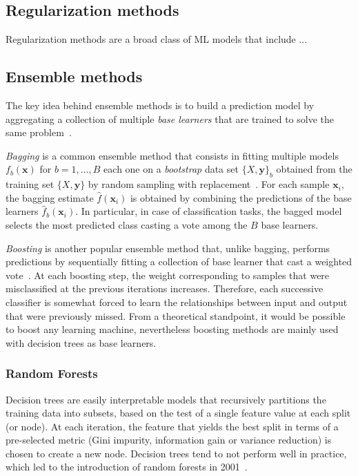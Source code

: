        

    \subsection{Regularization methods}
    Regularization methods are a broad class of ML models that include ...

    \subsection{Ensemble methods}

    The key idea behind ensemble methods is to build a prediction model by aggregating a collection of multiple \textit{base learners} that are trained to solve the same problem~\citep{zhou2012ensemble}.

    \textit{Bagging} is a common ensemble method that consists in fitting multiple models $f_b(\bm{x})$ for $b=1,\dots,B$ each one on a \textit{bootstrap} data set $\{X,\bm{y}\}_b$ obtained from the training set $\{X,\bm{y}\}$ by random sampling with replacement~\citep{hastie2009elements}. For each sample $\bm{x}_i$, the bagging estimate $\hat{f}(\bm{x}_i)$ is obtained by combining the predictions of the base learners $\hat{f}_b(\bm{x}_i)$. In particular, in case of classification tasks, the bagged model selects the most predicted class casting a vote among the $B$ base learners.

    \textit{Boosting} is another popular ensemble method that, unlike bagging, performs predictions by sequentially fitting a collection of base learner that cast a weighted vote~\citep{hastie2009elements}. At each boosting step, the weight corresponding to samples that were misclassified at the previous iterations increases. Therefore, each successive classifier is somewhat forced to learn the relationships between input and output that were previously missed. From a theoretical standpoint, it would be possible to boost any learning machine, nevertheless boosting methods are mainly used with decision trees as base learners.


    \subsubsection{Random Forests}
    Decision trees are easily interpretable models that recursively partitions the training data into subsets, based on the test of a single feature value at each split (or node). At each iteration, the feature that yields the best split in terms of a pre-selected metric (Gini impurity, information gain or variance reduction) is chosen to create a new node. Decision trees tend to not perform well in practice, which led to the introduction of random forests in 2001~\cite{breiman2001random}.


